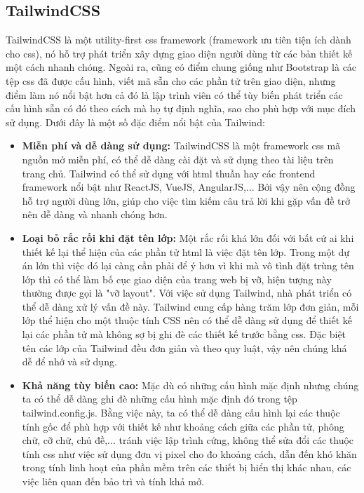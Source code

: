 \documentclass[./../main.tex]{subfiles}
\begin{document}
\subsection{TailwindCSS}
TailwindCSS \cite{tailwindcss} là một utility-first \acrshort{css} framework (framework ưu tiên tiện ích dành cho \acrshort{css}), nó hỗ trợ phát triển xây dựng giao diện người dùng từ các bản thiết kế một cách nhanh chóng. Ngoài ra, cũng có điểm chung giống như Bootstrap là các tệp \acrshort{css} đã được cấu hình, viết mã sẵn cho các phần tử trên giao diện, nhưng điểm làm nó nổi bật hơn cả đó là lập trình viên có thể tùy biến phát triển các cấu hình sẵn có đó theo cách mà họ tự định nghĩa, sao cho phù hợp với mục đích sử dụng. Dưới đây là một số đặc điểm nổi bật của Tailwind:
\begin{itemize}
    \item \textbf{Miễn phí và dễ dàng sử dụng:} TailwindCSS là một framework \acrshort{css} mã nguồn mở miễn phí, có thể dễ dàng cài đặt và sử dụng theo tài liệu trên trang chủ. Tailwind có thể sử dụng với \acrshort{html} thuần hay các frontend framework nổi bật như ReactJS, VueJS, AngularJS,... Bởi vậy nên cộng đồng hỗ trợ người dùng lớn, giúp cho việc tìm kiếm câu trả lời khi gặp vấn đề trở nên dễ dàng và nhanh chóng hơn.
    \item \textbf{Loại bỏ rắc rối khi đặt tên lớp:} Một rắc rối khá lớn đối với bất cứ ai khi thiết kế lại thể hiện của các phần tử \acrshort{html} là việc đặt tên lớp. Trong một dự án lớn thì việc đó lại càng cần phải để ý hơn vì khi mà vô tình đặt trùng tên lớp thì có thể làm bố cục giao diện của trang web bị vỡ, hiện tượng này thường được gọi là "vỡ layout". Với việc sử dụng Tailwind, nhà phát triển có thể dễ dàng xử lý vấn đề này. Tailwind cung cấp hàng trăm lớp đơn giản, mỗi lớp thể hiện cho một thuộc tính CSS nên có thể dễ dàng sử dụng để thiết kế lại các phần tử mà không sợ bị ghi đè các thiết kế trước bằng \acrshort{css}. Đặc biệt tên các lớp của Tailwind đều đơn giản và theo quy luật, vậy nên chúng khá dễ để nhớ và sử dụng. 
    \item \textbf{Khả năng tùy biến cao:} Mặc dù có những cấu hình mặc định nhưng chúng ta có thể dễ dàng ghi đè những cấu hình mặc định đó trong tệp tailwind.config.js. Bằng việc này, ta có thể dễ dàng cấu hình lại các thuộc tính gốc để phù hợp với thiết kế như khoảng cách giữa các phần tử, phông chữ, cỡ chữ, chủ đề,... tránh việc lập trình cứng, không thể sửa đổi các thuộc tính \acrshort{css} như việc sử dụng đơn vị pixel cho đo khoảng cách, dẫn đến khó khăn trong tính linh hoạt của phần mềm trên các thiết bị hiển thị khác nhau, các việc liên quan đến bảo trì và tính khả mở.

\end{itemize}
\end{document}
